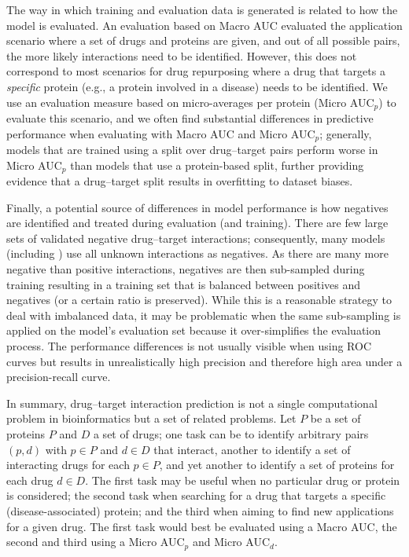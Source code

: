 \documentclass{bioinfo}
\begin{document}
The way in which training and evaluation data is generated is related
to how the model is evaluated. An evaluation based on Macro AUC
evaluated the application scenario where a set of drugs and proteins
are given, and out of all possible pairs, the more likely interactions
need to be identified. However, this does not correspond to most
scenarios for drug repurposing where a drug that targets a {\em
  specific} protein (e.g., a protein involved in a disease) needs to
be identified. We use an evaluation measure based on micro-averages
per protein (Micro AUC$_p$) to evaluate this scenario, and we often
find substantial differences in predictive performance when evaluating
with Macro AUC and Micro AUC$_p$; generally, models that are trained
using a split over drug--target pairs perform worse in Micro AUC$_p$
than models that use a protein-based split, further providing evidence
that a drug--target split results in overfitting to dataset biases.

Finally, a potential source of differences in model performance is how
negatives are identified and treated during evaluation (and
training). There are few large sets of validated negative drug--target
interactions; consequently, many models (including \name{}) use all
unknown interactions as negatives. As there are many more negative
than positive interactions, negatives are then sub-sampled during
training resulting in a training set that is balanced between
positives and negatives (or a certain ratio is preserved). While this
is a reasonable strategy to deal with imbalanced data, it may be
problematic when the same sub-sampling is applied on the model's
evaluation set because it over-simplifies the evaluation process. The
performance differences is not usually visible when using ROC curves
but results in unrealistically high precision and therefore high area
under a precision-recall curve.

In summary, drug--target interaction prediction is not a single
computational problem in bioinformatics but a set of related
problems. Let $P$ be a set of proteins $P$ and $D$ a set of drugs; one
task can be to identify arbitrary pairs $(p,d)$ with $p \in P$ and
$d \in D$ that interact, another to identify a set of interacting
drugs for each $p \in P$, and yet another to identify a set of
proteins for each drug $d \in D$. The first task may be useful when no
particular drug or protein is considered; the second task when
searching for a drug that targets a specific (disease-associated)
protein; and the third when aiming to find new applications for a
given drug. The first task would best be evaluated using a Macro AUC,
the second and third using a Micro AUC$_p$ and Micro AUC$_d$.
\end{document}

